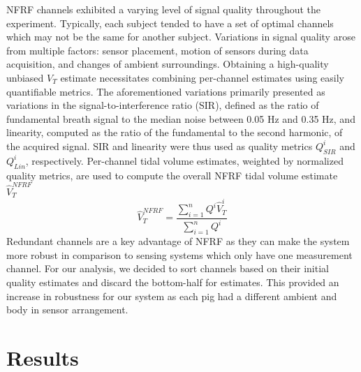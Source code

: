 \documentclass[journal,twoside,web]{ieeecolor}
\begin{document}
NFRF channels exhibited a varying level of signal quality throughout the experiment. Typically, each subject tended to have a set of optimal channels which may not be the same for another subject. Variations in signal quality arose from multiple factors: sensor placement, motion of sensors during data acquisition, and changes of ambient surroundings. Obtaining a high-quality unbiased $V_T$ estimate necessitates combining per-channel estimates using easily quantifiable metrics. The aforementioned variations primarily presented as variations in the signal-to-interference ratio (SIR), defined as the ratio of fundamental breath signal to the median noise between 0.05 Hz and 0.35 Hz, and linearity, computed as the ratio of the fundamental to the second harmonic, of the acquired signal. SIR and linearity were thus used as quality metrics $Q^{i}_{SIR}$ and $Q^{i}_{Lin}$, respectively. Per-channel tidal volume estimates, weighted by normalized quality metrics, are used to compute the overall NFRF tidal volume estimate $\hat{V}^{NFRF}_{T}$ 
\begin{equation}
    \hat{V}^{NFRF}_{T} = \frac{\sum_{i=1}^{n} Q^{i} \hat{V}^{i}_{T}}{\sum_{i=1}^{n} Q^{i}}
    \label{eq:combine_channels}
\end{equation}
Redundant channels are a key advantage of NFRF as they can make the system more robust in comparison to sensing systems which only have one measurement channel. For our analysis, we decided to sort channels based on their initial quality estimates and discard the bottom-half for estimates. This provided an increase in robustness for our system as each pig had a different ambient and body in sensor arrangement. 


\section{Results}
\end{document}
